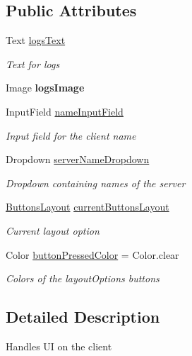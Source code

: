\subsection*{Public Attributes}
\begin{DoxyCompactItemize}
\item 
Text \mbox{\hyperlink{class_game_pad_1_1_u_i_controller_client_a0849e4994cc27984d3aaefee4e43b245}{logs\+Text}}
\begin{DoxyCompactList}\small\item\em Text for logs \end{DoxyCompactList}\item 
\mbox{\label{class_game_pad_1_1_u_i_controller_client_a9919c176d5f4e7338adc43f74fc9d4ef}} 
Image {\bfseries logs\+Image}
\item 
Input\+Field \mbox{\hyperlink{class_game_pad_1_1_u_i_controller_client_ae46ff866a58239cb2c2793582c3b3415}{name\+Input\+Field}}
\begin{DoxyCompactList}\small\item\em Input field for the client name \end{DoxyCompactList}\item 
Dropdown \mbox{\hyperlink{class_game_pad_1_1_u_i_controller_client_af74bf28f456f3d49181e9726cb6359bd}{server\+Name\+Dropdown}}
\begin{DoxyCompactList}\small\item\em Dropdown containing names of the server \end{DoxyCompactList}\item 
\mbox{\hyperlink{class_game_pad_1_1_buttons_layout}{Buttons\+Layout}} \mbox{\hyperlink{class_game_pad_1_1_u_i_controller_client_a2d73e4e59d892e4af36dc174b24eebef}{current\+Buttons\+Layout}}
\begin{DoxyCompactList}\small\item\em Current layout option \end{DoxyCompactList}\item 
Color \mbox{\hyperlink{class_game_pad_1_1_u_i_controller_client_a4877c17daea5bc7cbbc1e6138cd528c1}{button\+Pressed\+Color}} = Color.\+clear
\begin{DoxyCompactList}\small\item\em Colors of the layout\+Options buttons \end{DoxyCompactList}\end{DoxyCompactItemize}


\subsection{Detailed Description}
Handles UI on the client 



